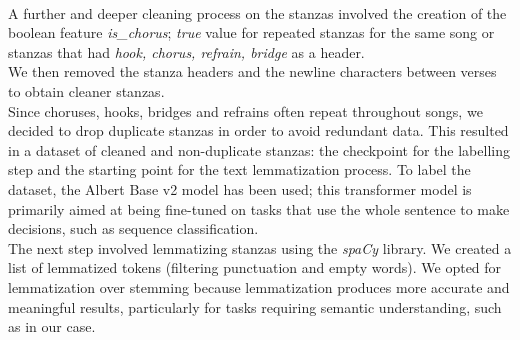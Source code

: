 \\
A further and deeper cleaning process on the stanzas involved the creation of the boolean feature \textit{is\_chorus}; \textit{true} value for repeated stanzas for the same song or stanzas that had \textit{hook, chorus, refrain, bridge} as a header. \\
We then removed the stanza headers and the newline characters between verses to obtain cleaner stanzas. \\ 
Since choruses, hooks, bridges and refrains often repeat throughout songs, we decided to drop duplicate stanzas in order to avoid redundant data.
This resulted in a dataset of cleaned and non-duplicate stanzas: the checkpoint for the labelling step and the starting point for the text lemmatization process. To label the dataset, the Albert Base v2 model has been used; this transformer model is primarily aimed at being fine-tuned on tasks that use the whole sentence to make decisions, such as sequence classification. 
\\
The next step involved lemmatizing stanzas using the \textit{spaCy} library. We created a list of lemmatized tokens (filtering punctuation and empty words). 
We opted for lemmatization over stemming because lemmatization produces more accurate and meaningful results, particularly for tasks requiring semantic understanding, such as in our case.








